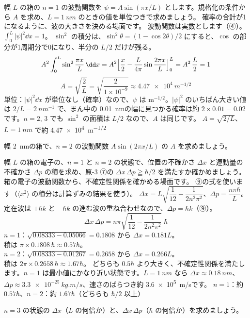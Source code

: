 \label{ph:原-5:ex4}
\begin{phreidai}
幅 $L$ の箱の $n=1$ の波動関数を $\psi=A\sin(\pi x/L)$ とします。規格化の条件から $A$ を求め、$L=\qty{1}{nm}$ のときの値を単位つきで求めましょう。
\phbamen
確率の合計が1になるように、波の大きさを決める場面です。
\phmushi
波動関数は実数とします（④）。
\phzu
$\displaystyle\int_0^L|\psi|^2\dd x=1$。
\phriyu
$\sin^2$ の積分は、$\sin^2\theta=(1-\cos2\theta)/2$ にすると、$\cos$ の部分が1周期分で0になり、半分の $L/2$ だけが残る。
\phtateru
\[A^2\int_0^L\sin^2\frac{\pi x}{L}\,\dd x=A^2\Bigl[\frac x2-\frac{L}{4\pi}\sin\frac{2\pi x}{L}\Bigr]_0^L=A^2\,\frac L2=1\]
\phtoku
\[A=\sqrt{\frac2L}=\sqrt{\frac{2}{1\times10^{-9}}}\approx\qty{4.47e4}{m^{-1/2}}\]
\phtashikame
単位：$|\psi|^2\dd x$ が単位なし（確率）なので、$\psi$ は $\text{m}^{-1/2}$。$|\psi|^2$ のいちばん大きい値は $2/L=\qty{2}{nm^{-1}}$ で、まん中の \qty{0.01}{nm}の幅に見つかる確率は約 $2\times0.01=0.02$ です。$n=2,\,3$ でも $\sin^2$ の面積は $L/2$ なので、$A$ は同じです。
\kotae $A=\sqrt{2/L}$、$L=\qty{1}{nm}$ で約 \qty{4.47e4}{m^{-1/2}}
\end{phreidai}
\begin{jibun}
幅 \qty{2}{nm}の箱で、$n=2$ の波動関数 $A\sin(2\pi x/L)$ の $A$ を求めましょう。
\end{jibun}

\label{ph:原-5:ex5}
\begin{phreidai}[不確定性関係を確かめる]
幅 $L$ の箱の電子の、$n=1$ と $n=2$ の状態で、位置の不確かさ $\Delta x$ と運動量の不確かさ $\Delta p$ の積を求め、原-3 ⑦の $\Delta x\,\Delta p\geqq\hbar/2$ を満たすか確かめましょう。
\phbamen
箱の電子の波動関数から、不確定性関係を確かめる場面です。
\phmushi
⑨の式を使います（$\langle x^2\rangle$ の積分は計算ずみの結果を使う）。
\phzu
$\Delta x=L\sqrt{\dfrac1{12}-\dfrac{1}{2n^2\pi^2}}$、$\Delta p=\dfrac{n\pi\hbar}{L}$。
\phriyu
定在波は $+\hbar k$ と $-\hbar k$ の進む波の重ね合わせなので、$\Delta p=\hbar k$（⑨）。
\phtateru
\[\Delta x\,\Delta p=n\pi\sqrt{\frac1{12}-\frac{1}{2n^2\pi^2}}\;\hbar\]
\phtoku
$n=1$：$\sqrt{0.08333-0.05066}=0.1808$ から $\Delta x=0.181L$。\\
\hspace*{2\zw}積は $\pi\times0.1808\,\hbar\approx0.57\hbar$。\\
$n=2$：$\sqrt{0.08333-0.01267}=0.2658$ から $\Delta x=0.266L$。\\
\hspace*{2\zw}積は $2\pi\times0.2658\,\hbar\approx1.67\hbar$。
\phtashikame
どちらも $0.5\hbar$ より大きく、不確定性関係を満たします。$n=1$ は最小値にかなり近い状態です。$L=\qty{1}{nm}$ なら $\Delta x\approx\qty{0.18}{nm}$、$\Delta p\approx\qty{3.3e-25}{kg.m/s}$、速さのばらつき約 \qty{3.6e5}{m/s}です。
\kotae $n=1$：約 $0.57\hbar$、$n=2$：約 $1.67\hbar$（どちらも $\hbar/2$ 以上）
\end{phreidai}
\begin{jibun}
$n=3$ の状態の $\Delta x$（$L$ の何倍か）と、$\Delta x\,\Delta p$（$\hbar$ の何倍か）を求めましょう。
\end{jibun}

